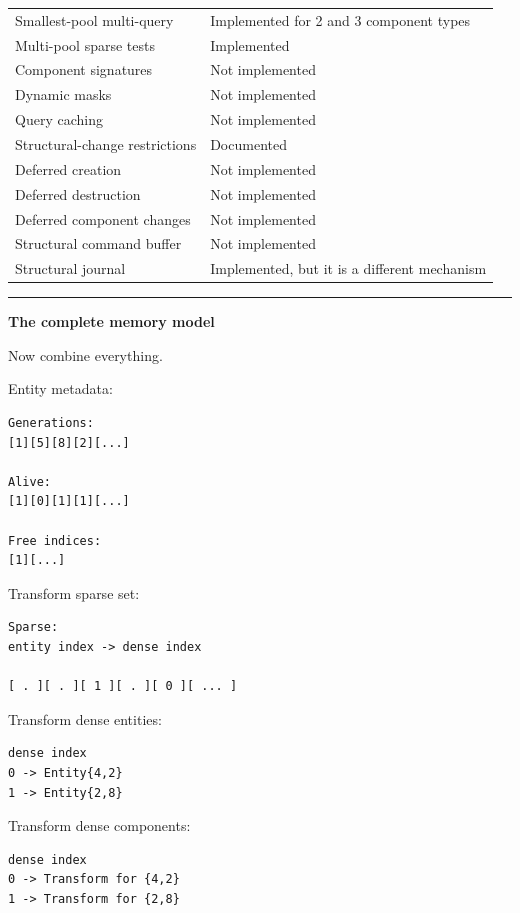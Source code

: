 {\begin{longtable}[]{@{}ll@{}}
Smallest-pool multi-query & Implemented for 2 and 3 component types \\
Multi-pool sparse tests & Implemented \\
Component signatures & Not implemented \\
Dynamic masks & Not implemented \\
Query caching & Not implemented \\
Structural-change restrictions & Documented \\
Deferred creation & Not implemented \\
Deferred destruction & Not implemented \\
Deferred component changes & Not implemented \\
Structural command buffer & Not implemented \\
Structural journal & Implemented, but it is a different mechanism \\
\end{longtable}
}

\begin{center}\rule{0.5\linewidth}{0.5pt}\end{center}

\textbf{The complete memory model}

Now combine everything.

Entity metadata:

\begin{verbatim}
Generations:
[1][5][8][2][...]

Alive:
[1][0][1][1][...]

Free indices:
[1][...]
\end{verbatim}

Transform sparse set:

\begin{verbatim}
Sparse:
entity index -> dense index

[ . ][ . ][ 1 ][ . ][ 0 ][ ... ]
\end{verbatim}

Transform dense entities:

\begin{verbatim}
dense index
0 -> Entity{4,2}
1 -> Entity{2,8}
\end{verbatim}

Transform dense components:

\begin{verbatim}
dense index
0 -> Transform for {4,2}
1 -> Transform for {2,8}
\end{verbatim}


